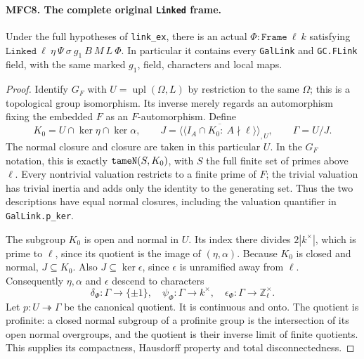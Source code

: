 \documentclass[11pt,a4paper]{article}
\numberwithin{equation}{section}
\theoremstyle{remark}\newtheorem{remark}[theorem]{Remark}
\begin{document}
\paragraph{MFC8. The complete original \texttt{Linked} frame.}
\label{claim:MFC8}
Under the full hypotheses of \texttt{link\_\allowbreak ex}, there is an
actual \(\Phi:\texttt{Frame}\ \ell\ k\) satisfying
\(\texttt{Linked}\ \ell\ \eta\ \Psi\ \sigma\ g_1\ B\ M\ L\ \Phi\).
In particular it contains every \texttt{Gal\allowbreak Link} and
\texttt{GC.\allowbreak FLink} field, with the same marked \(g_1\), field,
characters and local maps.

\begin{proof}
Identify \(G_F\) with \(U=\operatorname{upl}(\Omega,L)\)
by restriction to the same \(\Omega\); this is a topological
group isomorphism.  Its inverse merely regards an automorphism
fixing the embedded \(F\) as an \(F\)-automorphism.  Define
\[
 K_0=U\cap\ker\eta\cap\ker\alpha,
 \qquad
 J=\overline{\langle\!\langle
       I_A\cap K_0:\ A\nmid\ell
                   \rangle\!\rangle}_{,U},\qquad
                         \Gamma=U/J.                      \tag{MFC.19}
\]
The normal closure and closure are taken in this particular \(U\).
In the \(G_F\) notation, this is exactly
\(\texttt{tame\allowbreak N}(S,K_0)\), with \(S\) the full finite set
of primes above \(\ell\).  Every nontrivial valuation restricts
to a finite prime of \(F\); the trivial valuation has trivial
inertia and adds only the identity to the generating set.
Thus the two descriptions have equal normal closures, including
the valuation quantifier in \texttt{Gal\allowbreak Link.\allowbreak p\_\allowbreak ker}.

The subgroup \(K_0\) is open and normal in \(U\).  Its index there divides
\(2|k^\times|\), which is prime to \(\ell\), since its
quotient is the image of \((\eta,\alpha)\).  Because \(K_0\)
is closed and normal, \(J\subseteq K_0\).  Also
\(J\subseteq\ker\epsilon\), since \(\epsilon\) is
unramified away from \(\ell\).  Consequently \(\eta,\alpha\)
and \(\epsilon\) descend to characters
\[
 \delta_\Phi:\Gamma\to\{\pm1\},\quad
 \psi_\Phi:\Gamma\to k^\times,\quad
 \epsilon_\Phi:\Gamma\to\mathbb Z_\ell^\times.            \tag{MFC.20}
\]
Let \(p:U\twoheadrightarrow\Gamma\) be the canonical quotient.
It is continuous and onto.  The quotient is profinite: a closed
normal subgroup of a profinite group is the intersection of its
open normal overgroups, and the quotient is their inverse limit
of finite quotients.  This supplies its compactness, Hausdorff
property and total disconnectedness.


\end{proof}
\end{document}
